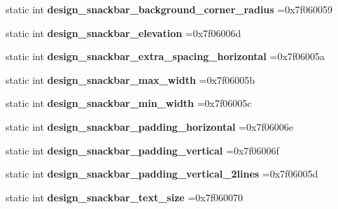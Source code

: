 \begin{DoxyCompactItemize}
static int {\bfseries design\+\_\+snackbar\+\_\+background\+\_\+corner\+\_\+radius} =0x7f060059
\item 
\mbox{\label{classandroid_1_1support_1_1design_1_1R_1_1dimen_adc70896bdb491850240e526c1e554cfe}} 
static int {\bfseries design\+\_\+snackbar\+\_\+elevation} =0x7f06006d
\item 
\mbox{\label{classandroid_1_1support_1_1design_1_1R_1_1dimen_a16376bc00c5ef3a24901063ada03c8a6}} 
static int {\bfseries design\+\_\+snackbar\+\_\+extra\+\_\+spacing\+\_\+horizontal} =0x7f06005a
\item 
\mbox{\label{classandroid_1_1support_1_1design_1_1R_1_1dimen_aa66a96881dfb430bb74322fe3a40937b}} 
static int {\bfseries design\+\_\+snackbar\+\_\+max\+\_\+width} =0x7f06005b
\item 
\mbox{\label{classandroid_1_1support_1_1design_1_1R_1_1dimen_ad3b29951a3016888decf25e3c453bade}} 
static int {\bfseries design\+\_\+snackbar\+\_\+min\+\_\+width} =0x7f06005c
\item 
\mbox{\label{classandroid_1_1support_1_1design_1_1R_1_1dimen_a3c4735fe3230582b91786607b9ef7f0b}} 
static int {\bfseries design\+\_\+snackbar\+\_\+padding\+\_\+horizontal} =0x7f06006e
\item 
\mbox{\label{classandroid_1_1support_1_1design_1_1R_1_1dimen_ac891446c8b53e90042b894917aaa4d51}} 
static int {\bfseries design\+\_\+snackbar\+\_\+padding\+\_\+vertical} =0x7f06006f
\item 
\mbox{\label{classandroid_1_1support_1_1design_1_1R_1_1dimen_af937204980a29caba62e13c4f10fc7fb}} 
static int {\bfseries design\+\_\+snackbar\+\_\+padding\+\_\+vertical\+\_\+2lines} =0x7f06005d
\item 
\mbox{\label{classandroid_1_1support_1_1design_1_1R_1_1dimen_af4a675e410229aeb106484dad1624ebf}} 
static int {\bfseries design\+\_\+snackbar\+\_\+text\+\_\+size} =0x7f060070

\end{DoxyCompactItemize}
